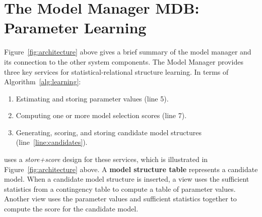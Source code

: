 \section{The Model Manager MDB: Parameter Learning} \label{sec:model-manager}






Figure~\ref{fig:architecture} above gives a brief summary of the model manager and its connection to the other system components. 
The Model Manager provides three key services for statistical-relational structure learning. In terms of Algorithm~\ref{alg:learning}: 

\begin{enumerate}
\item  Estimating and storing parameter values (line 5).
\item Computing one or more model selection scores (line 7).
\item Generating, scoring, and storing candidate model structures (line~\ref{line:candidates}).
\end{enumerate}

\FB  uses a {\em store+score} design for these services, which is illustrated in 
Figure~\ref{fig:architecture} above. 
A \textbf{model structure table} represents a candidate model. When a candidate model structure is inserted, a view uses the sufficient statistics from a contingency table to compute a table of parameter values. Another view uses the parameter values and sufficient statistics together to compute the score for the candidate model. 

